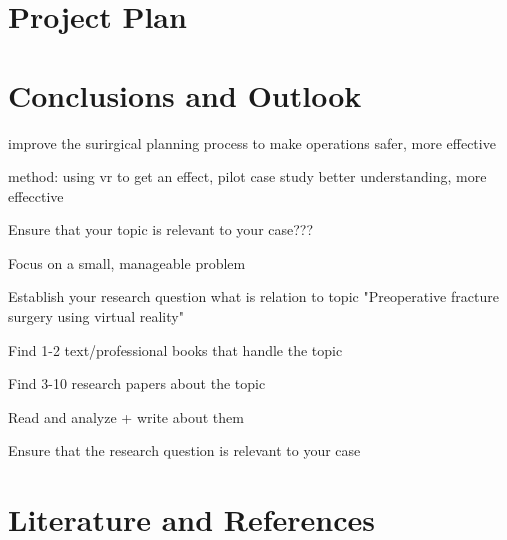 \documentclass[11pt]{scrartcl}
\begin{document}
\section{Project Plan}



\section{Conclusions and Outlook}







improve the surirgical planning process to make operations safer, more effective

method: using vr to get an effect, pilot case study
better understanding, more effecctive

Ensure that your topic is relevant to your case???

Focus on a small, manageable problem

Establish your research question
what is relation to topic
"Preoperative fracture surgery using virtual reality"

Find 1-2 text/professional books that handle the topic

Find 3-10 research papers about the topic

Read and analyze + write about them

Ensure that the research question is relevant to your case


\section{Literature and References}


\printbibliography
\end{document}

